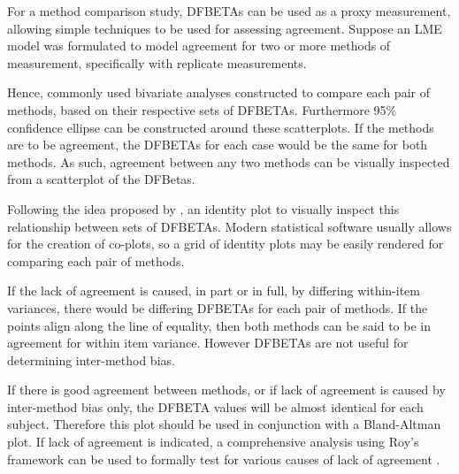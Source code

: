 \documentclass[12pt, a4paper]{report}
\theoremstyle{definition}
\theoremstyle{remark}
\begin{document}
For a method comparison study, DFBETAs can be used as a proxy measurement, allowing simple techniques to be used for assessing agreement. Suppose an LME model was formulated to model agreement for two or more methods of measurement, specifically with replicate measurements.

Hence, commonly used bivariate analyses constructed to compare each pair of methods, based on their respective sets of DFBETAs. Furthermore 95\% confidence ellipse can be constructed around these scatterplots. If the methods are to be agreement, the DFBETAs for each case would be the same for both methods. As such, agreement between any two methods can be visually inspected from a scatterplot of the DFBetas. 



Following the idea proposed by \citet{BA86}, an identity plot to visually inspect this relationship between sets of DFBETAs. Modern statistical software usually allows for the creation of co-plots, so a grid of identity plots may be easily rendered for comparing each pair of methods.

If the lack of agreement is caused, in part or in full, by differing within-item variances, there would be differing DFBETAs for each pair of methods. If the points align along the line of equality, then both methods can be said to be in agreement for within item variance. However DFBETAs are not useful for determining inter-method bias. 

If there is good agreement between methods, or if lack of agreement is caused by inter-method bias only, the DFBETA values will be almost identical for each subject. Therefore this plot should be used in conjunction with a Bland-Altman plot. If lack of agreement is indicated, a comprehensive analysis using Roy's framework can be used to formally test for various causes of lack of agreement \citep{ARoy2009}.
\end{document}
